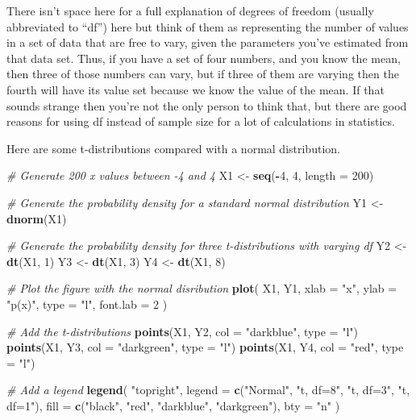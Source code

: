 \documentclass[
]{book}
\newenvironment{Shaded}{\begin{snugshade}}{\end{snugshade}}
\newcommand{\CommentTok}[1]{\textcolor[rgb]{0.56,0.35,0.01}{\textit{#1}}}
\newcommand{\DataTypeTok}[1]{\textcolor[rgb]{0.13,0.29,0.53}{#1}}
\newcommand{\DecValTok}[1]{\textcolor[rgb]{0.00,0.00,0.81}{#1}}
\newcommand{\KeywordTok}[1]{\textcolor[rgb]{0.13,0.29,0.53}{\textbf{#1}}}
\newcommand{\NormalTok}[1]{#1}
\newcommand{\OperatorTok}[1]{\textcolor[rgb]{0.81,0.36,0.00}{\textbf{#1}}}
\newcommand{\StringTok}[1]{\textcolor[rgb]{0.31,0.60,0.02}{#1}}
\begin{document}
There isn't space here for a full explanation of degrees of freedom (usually abbreviated to ``df'') here but think of them as representing the number of values in a set of data that are free to vary, given the parameters you've estimated from that data set. Thus, if you have a set of four numbers, and you know the mean, then three of those numbers can vary, but if three of them are varying then the fourth will have its value set because we know the value of the mean. If that sounds strange then you're not the only person to think that, but there are good reasons for using df instead of sample size for a lot of calculations in statistics.

Here are some t-distributions compared with a normal distribution.

\begin{Shaded}
\begin{Highlighting}[]

\CommentTok{# Generate 200 x values between -4 and 4}
\NormalTok{X1 <-}\StringTok{ }\KeywordTok{seq}\NormalTok{(}\OperatorTok{-}\DecValTok{4}\NormalTok{, }\DecValTok{4}\NormalTok{, }\DataTypeTok{length =} \DecValTok{200}\NormalTok{)}

\CommentTok{# Generate the probability density for a standard normal distribution}
\NormalTok{Y1 <-}\StringTok{ }\KeywordTok{dnorm}\NormalTok{(X1)}

\CommentTok{# Generate the probability density for three t-distributions with varying df}
\NormalTok{Y2 <-}\StringTok{ }\KeywordTok{dt}\NormalTok{(X1, }\DecValTok{1}\NormalTok{)}
\NormalTok{Y3 <-}\StringTok{ }\KeywordTok{dt}\NormalTok{(X1, }\DecValTok{3}\NormalTok{)}
\NormalTok{Y4 <-}\StringTok{ }\KeywordTok{dt}\NormalTok{(X1, }\DecValTok{8}\NormalTok{)}

\CommentTok{# Plot the figure with the normal disribution}
\KeywordTok{plot}\NormalTok{(}
\NormalTok{  X1,}
\NormalTok{  Y1,}
  \DataTypeTok{xlab =} \StringTok{"x"}\NormalTok{,}
  \DataTypeTok{ylab =} \StringTok{"p(x)"}\NormalTok{,}
  \DataTypeTok{type =} \StringTok{"l"}\NormalTok{,}
  \DataTypeTok{font.lab =} \DecValTok{2}
\NormalTok{)}

\CommentTok{# Add the t-distributions}
\KeywordTok{points}\NormalTok{(X1, Y2, }\DataTypeTok{col =} \StringTok{"darkblue"}\NormalTok{, }\DataTypeTok{type =} \StringTok{"l"}\NormalTok{)}
\KeywordTok{points}\NormalTok{(X1, Y3, }\DataTypeTok{col =} \StringTok{"darkgreen"}\NormalTok{, }\DataTypeTok{type =} \StringTok{"l"}\NormalTok{)}
\KeywordTok{points}\NormalTok{(X1, Y4, }\DataTypeTok{col =} \StringTok{"red"}\NormalTok{, }\DataTypeTok{type =} \StringTok{"l"}\NormalTok{)}

\CommentTok{# Add a legend}
\KeywordTok{legend}\NormalTok{(}
  \StringTok{"topright"}\NormalTok{,}
  \DataTypeTok{legend =} \KeywordTok{c}\NormalTok{(}\StringTok{"Normal"}\NormalTok{, }\StringTok{"t, df=8"}\NormalTok{, }\StringTok{"t, df=3"}\NormalTok{, }\StringTok{"t, df=1"}\NormalTok{),}
  \DataTypeTok{fill =} \KeywordTok{c}\NormalTok{(}\StringTok{"black"}\NormalTok{, }\StringTok{"red"}\NormalTok{, }\StringTok{"darkblue"}\NormalTok{, }\StringTok{"darkgreen"}\NormalTok{),}
  \DataTypeTok{bty =} \StringTok{"n"}
\NormalTok{)}
\end{Highlighting}
\end{Shaded}
\end{document}
